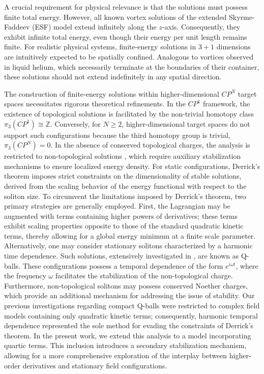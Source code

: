 \documentclass[aps,prd,superscriptaddress,notitlepage,11pt,final,longbibliography,nofootinbib]{revtex4-1}
\numberwithin{equation}{section}
\begin{document}
A crucial requirement for physical relevance is that the solutions must possess finite total energy. However, all known vortex solutions of the extended Skyrme-Faddeev (ESF) model extend infinitely along the $z$-axis. Consequently, they exhibit infinite total energy, even though their energy per unit length remains finite. For realistic physical systems, finite-energy solutions in $3+1$ dimensions are intuitively expected to be spatially confined. Analogous to vortices observed in liquid helium, which necessarily terminate at the boundaries of their container, these solutions should not extend indefinitely in any spatial direction.

The construction of finite-energy solutions within higher-dimensional $CP^N$ target spaces necessitates rigorous theoretical refinements. In the $CP^1$ framework, the existence of topological solutions is facilitated by the non-trivial homotopy class $\pi_3(CP^1) \cong \mathbb{Z}$. Conversely, for $N \ge 2$, higher-dimensional target spaces do not support such configurations because the third homotopy group is trivial, $\pi_3(CP^N) = 0$. In the absence of conserved topological charges, the analysis is restricted to non-topological solutions \cite{LEE1992251}, which require auxiliary stabilization mechanisms to ensure localized energy density. For static configurations, Derrick's theorem \cite{Derrick:1964ww} imposes strict constraints on the dimensionality of stable solutions, derived from the scaling behavior of the energy functional with respect to the soliton size. To circumvent the limitations imposed by Derrick's theorem, two primary strategies are generally employed. First, the Lagrangian may be augmented with terms containing higher powers of derivatives; these terms exhibit scaling properties opposite to those of the standard quadratic kinetic terms, thereby allowing for a global energy minimum at a finite scale parameter. Alternatively, one may consider stationary solitons characterized by a harmonic time dependence. Such solutions, extensively investigated in \cite{Lee:1991ax, Rosen:1968mfz, Werle:1977cc}, are known as Q-balls. These configurations possess a temporal dependence of the form $e^{i\omega t}$, where the frequency $\omega$ facilitates the stabilization of the non-topological charge. Furthermore, non-topological solitons may possess conserved Noether charges, which provide an additional mechanism for addressing the issue of stability. Our previous investigations regarding compact Q-balls were restricted to complex field models containing only quadratic kinetic terms; consequently, harmonic temporal dependence represented the sole method for evading the constraints of Derrick's theorem. In the present work, we extend this analysis to a model incorporating quartic terms. This inclusion introduces a secondary stabilization mechanism, allowing for a more comprehensive exploration of the interplay between higher-order derivatives and stationary field configurations.
\end{document}
